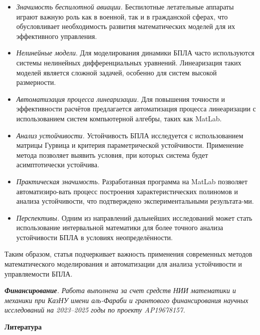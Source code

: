\begin{multicols}{2}
\begin{itemize}
  \setlength{\itemindent}{1cm}
\item
  \emph{Значимость беспилотной авиации.} Беспилотные летательные
  аппараты играют важную роль как в военной, так и в гражданской сферах,
  что обусловливает необходимость развития математических моделей для их
  эффективного управления.
\item
  \emph{Нелинейные модели}. Для моделирования динамики БПЛА часто
  используются системы нелинейных дифференциальных уравнений.
  Линеаризация таких моделей является сложной задачей, особенно для
  систем высокой размерности.
\item
  \emph{Автоматизация процесса линеаризации.} Для повышения точности и
  эффективности расчётов предлагается автоматизация процесса
  линеаризации с использованием систем компьютерной алгебры, таких как
  MatLab.
\item
  \emph{Анализ устойчивости.} Устойчивость БПЛА исследуется с
  использованием матрицы Гурвица и критерия параметрической
  устойчивости. Применение метода позволяет выявить условия, при которых
  система будет асимптотически устойчива.
\item
  \emph{Практическая значимость.} Разработанная программа на MatLab
  позволяет автоматизиро-вать процесс построения характеристических
  полиномов и анализа устойчивости, что подтверждено экспериментальными
  результата-ми.
\item
  \emph{Перспективы.} Одним из направлений дальнейших исследований может
  стать использование интервальной математики для более точного анализа
  устойчивости БПЛА в условиях неопределённости.
\end{itemize}

Таким образом, статья подчеркивает важность применения современных
методов математического моделирования и автоматизации для анализа
устойчивости и управляемости БПЛА.

\emph{{\bfseries Финансирование}. Работа выполнена за счет средств НИИ
математики и механики при КазНУ имени аль-Фараби и грантового
финансирования научных исследований на 2023--2025 годы по проекту
AP19678157.}
\end{multicols}


\begin{center}
  {\bfseries Литература}
  \end{center}


